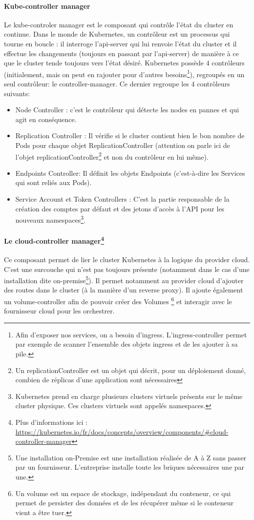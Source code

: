 \documentclass[11pt,fleqn]{book} %
\begin{document}
\paragraph*{Kube-controller manager}
Le kube-controler manager est le composant qui contrôle l'état du cluster en continue. Dans le monde de Kubernetes, un contrôleur est un processus qui tourne en boucle : il interroge l'api-server qui lui renvoie l'état du cluster et il effectue les changements (toujours en passant par l'api-server) de manière à ce que le cluster tende toujours vers l'état désiré. Kubernetes possède 4 contrôleurs (initialement, mais on peut en rajouter pour d'autres besoins\footnote{Afin d'exposer nos services, on a besoin d'ingress. L'ingress-controller permet par exemple de scanner l'ensemble des objets ingress et de les ajouter à sa pile.}), regroupés en un seul contrôleur: le controller-manager. Ce dernier regroupe les 4 contrôleurs suivants: 
\begin{itemize}
    \item Node Controller : c'est le contrôleur qui détecte les nodes en pannes et qui agit en conséquence.
    \item Replication Controller : Il vérifie si le cluster contient bien le bon nombre de Pods pour chaque objet ReplicationController (attention on parle ici de l'objet replicationController\footnote{Un replicationController est un objet qui décrit, pour un déploiement donné, combien de réplicas d'une application sont nécessaires} et non du contrôleur en lui même).
    \item Endpoints Controller: Il définit les objets Endpoints (c’est-à-dire les Services qui sont reliés aux Pods).
    \item Service Account et Token Controllers : C'est la partie responsable de la création des comptes par défaut et des jetons d'accès à l'API pour les nouveaux namespaces\footnote{Kubernetes prend en charge plusieurs clusters virtuels présents sur le même cluster physique. Ces clusters virtuels sont appelés namespaces.}.
\end{itemize}

\paragraph{Le cloud-controller manager\footnote{Plus d'informations ici : \url{https://kubernetes.io/fr/docs/concepts/overview/components/\#cloud-controller-manager}}}
Ce composant permet de lier le cluster Kubernetes à la logique du provider cloud. C'est une surcouche qui n'est pas toujours présente (notamment dans le cas d'une installation dite on-premise\footnote{Une installation on-Premise est une installation réalisée de A à Z sans passer par un fournisseur. L'entreprise installe toute les briques nécessaires une par une.}). Il permet notamment au provider cloud d'ajouter des routes dans le cluster (à la manière d'un reverse proxy). Il ajoute également un volume-controller afin de pouvoir créer des Volumes \footnote{Un volume est un espace de stockage, indépendant du conteneur, ce qui permet de persister des données et de les récupérer même si le conteneur vient a être tuer.} et interagir avec le fournisseur cloud pour les orchestrer.
\end{document}
